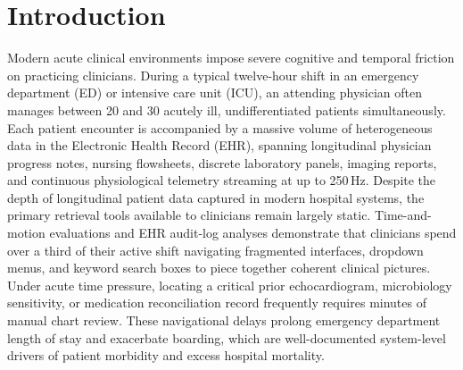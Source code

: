 \documentclass[12pt]{article}
\begin{document}
\newpage

\section*{Introduction}

Modern acute clinical environments impose severe cognitive and temporal friction on practicing clinicians. During a typical twelve-hour shift in an emergency department (ED) or intensive care unit (ICU), an attending physician often manages between 20 and 30 acutely ill, undifferentiated patients simultaneously\cite{topol2019high,miotto2018deep}. Each patient encounter is accompanied by a massive volume of heterogeneous data in the Electronic Health Record (EHR), spanning longitudinal physician progress notes, nursing flowsheets, discrete laboratory panels, imaging reports, and continuous physiological telemetry streaming at up to 250\,Hz\cite{johnson2023mimic,hyland2020hirid}. Despite the depth of longitudinal patient data captured in modern hospital systems, the primary retrieval tools available to clinicians remain largely static\cite{sutton2020overview,wornow2023shaky}. Time-and-motion evaluations and EHR audit-log analyses demonstrate that clinicians spend over a third of their active shift navigating fragmented interfaces, dropdown menus, and keyword search boxes to piece together coherent clinical pictures\cite{sinsky2016allocation,zheng2021analyzing}. Under acute time pressure, locating a critical prior echocardiogram, microbiology sensitivity, or medication reconciliation record frequently requires minutes of manual chart review\cite{obermeyer2016predicting,singh2014types}. These navigational delays prolong emergency department length of stay and exacerbate boarding, which are well-documented system-level drivers of patient morbidity and excess hospital mortality\cite{singer2011crowding,pines2011emergency,singh2014types}.
\end{document}
